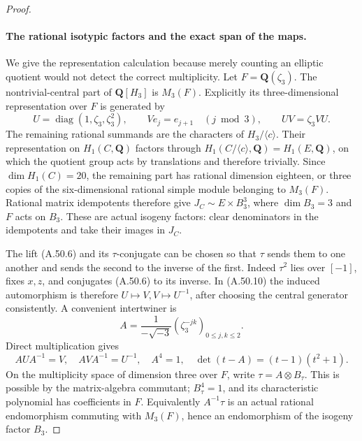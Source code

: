 \begin{proof}
\paragraph{The rational isotypic factors and the exact span of the maps.}
We give the representation calculation because merely
counting an elliptic quotient would not detect the
correct multiplicity. Let \(F=\mathbf Q(\zeta_3)\).
The nontrivial-central part of \(\mathbf Q[H_3]\)
is \(M_3(F)\). Explicitly its three-dimensional
representation over \(F\) is generated by
\[
 U=\operatorname{diag}(1,\zeta_3,\zeta_3^2),
       \qquad V e_j=e_{j+1}\quad(j\bmod3),
       \qquad UV=\zeta_3VU.                       \tag{A.50.10}
\]
The remaining rational summands are the characters
of \(H_3/\langle c\rangle\). Their representation
on \(H_1(C,\mathbf Q)\) factors through
\(H_1(C/\langle c\rangle,\mathbf Q)=H_1(E,\mathbf Q)\),
on which the quotient group acts by translations and
therefore trivially. Since \(\dim H_1(C)=20\), the
remaining part has rational dimension eighteen,
or three copies of the six-dimensional rational
simple module belonging to \(M_3(F)\).
Rational matrix idempotents therefore give
\(J_C\sim E\times B_3^3\), where
\(\dim B_3=3\) and \(F\) acts on \(B_3\).
These are actual isogeny factors: clear denominators
in the idempotents and take their images in \(J_C\).

The lift (A.50.6) and its \(\tau\)-conjugate can
be chosen so that \(\tau\) sends them to one
another and sends the second to the inverse of the
first. Indeed \(\tau^2\) lies over \([-1]\),
fixes \(x,z\), and conjugates (A.50.6) to its
inverse. In (A.50.10) the induced automorphism is
therefore \(U\mapsto V,V\mapsto U^{-1}\), after
choosing the central generator consistently.
A convenient intertwiner is
\[
 A=\frac1{-\sqrt{-3}}
       (\zeta_3^{-jk})_{0\le j,k\le2}.
                                                               \tag{A.50.11}
\]
Direct multiplication gives
\[
 AUA^{-1}=V,\quad AVA^{-1}=U^{-1},\quad A^4=1,
 \quad\det(t-A)=(t-1)(t^2+1).                   \tag{A.50.12}
\]
On the multiplicity space of dimension three over
\(F\), write \(\tau=A\otimes B_\tau\).
This is possible by the matrix-algebra commutant;
\(B_\tau^4=1\), and its characteristic polynomial
has coefficients in \(F\). Equivalently
\(A^{-1}\tau\) is an actual rational endomorphism
commuting with \(M_3(F)\), hence an endomorphism
of the isogeny factor \(B_3\).


\end{proof}
